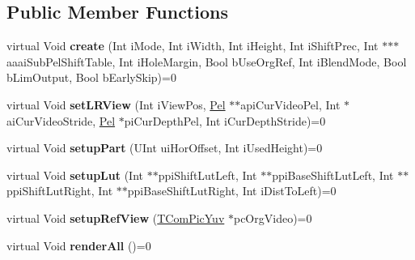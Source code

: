 \subsection*{Public Member Functions}
\begin{DoxyCompactItemize}
\item 
\mbox{\label{class_t_ren_single_model_a7c9c52173dba466b48c45112daee3614}} 
virtual Void {\bfseries create} (Int i\+Mode, Int i\+Width, Int i\+Height, Int i\+Shift\+Prec, Int $\ast$$\ast$$\ast$aaai\+Sub\+Pel\+Shift\+Table, Int i\+Hole\+Margin, Bool b\+Use\+Org\+Ref, Int i\+Blend\+Mode, Bool b\+Lim\+Output, Bool b\+Early\+Skip)=0
\item 
\mbox{\label{class_t_ren_single_model_a7e1ed684969122c44b549fb7abd83ee8}} 
virtual Void {\bfseries set\+L\+R\+View} (Int i\+View\+Pos, \hyperlink{_type_def_8h_af92141699657699b4b547be0c8517541}{Pel} $\ast$$\ast$api\+Cur\+Video\+Pel, Int $\ast$ai\+Cur\+Video\+Stride, \hyperlink{_type_def_8h_af92141699657699b4b547be0c8517541}{Pel} $\ast$pi\+Cur\+Depth\+Pel, Int i\+Cur\+Depth\+Stride)=0
\item 
\mbox{\label{class_t_ren_single_model_ad650befb7c38d4871b9d1ddf89f5bad5}} 
virtual Void {\bfseries setup\+Part} (U\+Int ui\+Hor\+Offset, Int i\+Used\+Height)=0
\item 
\mbox{\label{class_t_ren_single_model_a24a8e0336875167747024171ff4cb3e7}} 
virtual Void {\bfseries setup\+Lut} (Int $\ast$$\ast$ppi\+Shift\+Lut\+Left, Int $\ast$$\ast$ppi\+Base\+Shift\+Lut\+Left, Int $\ast$$\ast$ppi\+Shift\+Lut\+Right, Int $\ast$$\ast$ppi\+Base\+Shift\+Lut\+Right, Int i\+Dist\+To\+Left)=0
\item 
\mbox{\label{class_t_ren_single_model_a192622d4027122604e6c359d2caeb6b9}} 
virtual Void {\bfseries setup\+Ref\+View} (\hyperlink{class_t_com_pic_yuv}{T\+Com\+Pic\+Yuv} $\ast$pc\+Org\+Video)=0
\item 
\mbox{\label{class_t_ren_single_model_abe00ed1e93efc80f63545342143e855b}} 
virtual Void {\bfseries render\+All} ()=0
\item 
\mbox{\label{class_t_ren_single_model_ab2d3d56bddfbe157c1680e72d4211d5e}} 
$$
\end{DoxyCompactItemize}
